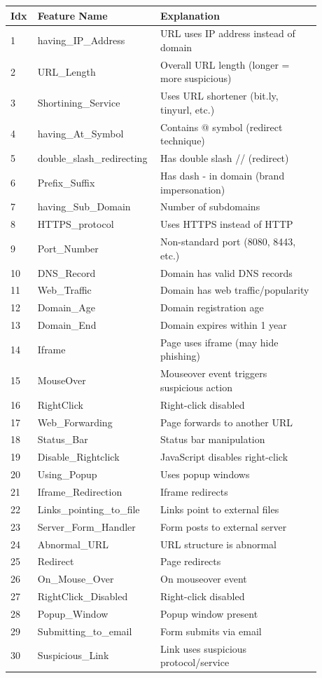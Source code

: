 \documentclass[12pt,a4paper]{report}
\begin{document}
\begin{longtable}{p{0.08\linewidth}p{0.30\linewidth}p{0.50\linewidth}}
\toprule
\textbf{Idx} & \textbf{Feature Name} & \textbf{Explanation} \\
\midrule
1 & having\_IP\_Address & URL uses IP address instead of domain \\
2 & URL\_Length & Overall URL length (longer = more suspicious) \\
3 & Shortining\_Service & Uses URL shortener (bit.ly, tinyurl, etc.) \\
4 & having\_At\_Symbol & Contains @ symbol (redirect technique) \\
5 & double\_slash\_redirecting & Has double slash // (redirect) \\
6 & Prefix\_Suffix & Has dash - in domain (brand impersonation) \\
7 & having\_Sub\_Domain & Number of subdomains \\
8 & HTTPS\_protocol & Uses HTTPS instead of HTTP \\
9 & Port\_Number & Non-standard port (8080, 8443, etc.) \\
10 & DNS\_Record & Domain has valid DNS records \\
11 & Web\_Traffic & Domain has web traffic/popularity \\
12 & Domain\_Age & Domain registration age \\
13 & Domain\_End & Domain expires within 1 year \\
14 & Iframe & Page uses iframe (may hide phishing) \\
15 & MouseOver & Mouseover event triggers suspicious action \\
16 & RightClick & Right-click disabled \\
17 & Web\_Forwarding & Page forwards to another URL \\
18 & Status\_Bar & Status bar manipulation \\
19 & Disable\_Rightclick & JavaScript disables right-click \\
20 & Using\_Popup & Uses popup windows \\
21 & Iframe\_Redirection & Iframe redirects \\
22 & Links\_pointing\_to\_file & Links point to external files \\
23 & Server\_Form\_Handler & Form posts to external server \\
24 & Abnormal\_URL & URL structure is abnormal \\
25 & Redirect & Page redirects \\
26 & On\_Mouse\_Over & On mouseover event \\
27 & RightClick\_Disabled & Right-click disabled \\
28 & Popup\_Window & Popup window present \\
29 & Submitting\_to\_email & Form submits via email \\
30 & Suspicious\_Link & Link uses suspicious protocol/service \\
\bottomrule
\end{longtable}
\end{document}
